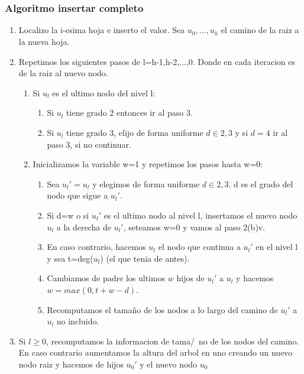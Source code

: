 \documentclass[10pt,handout]{beamer}
\begin{document}
\section{}
\begin{frame}[noframenumbering]
  \frametitle{Algoritmo insertar completo}
\small
\begin{enumerate}\itemsep0em
  \item Localizo la i-esima hoja e inserto el valor. Sea $u_0,...,u_h$ el camino
    de la raiz a la nueva hoja.
  \item Repetimos los siguientes pasos de l=h-1,h-2,...,0. Donde en cada iteracion
    es de la raiz al nuevo nodo.
    \vspace{-0.05cm}
    \begin{enumerate}[a]\itemsep0em
      \item Si $u_l$ es el ultimo nodo del nivel l:
        \vspace{-0.05cm}
        \begin{enumerate}[i]\itemsep0em
          \item Si $u_l$ tiene grado 2 entonces ir al paso 3.
          \item Si $u_l$ tiene grado 3, elijo de forma uniforme $d\in{2,3}$ y si
            $d=4$ ir al paso 3, si no continuar.
        \end{enumerate}
      \item Inicializamos la variable w=1 y repetimos los pasos hasta w=0:
        \vspace{-0.05cm}
        \begin{enumerate}[i]\itemsep0em
          \item Sea $u_l'=u_l$ y elegimos de forma uniforme $d\in{2,3}$. d es el grado
            del nodo que sigue a $u_l'$.
          \item Si d=w o si $u_l'$ es el ultimo nodo al nivel l, insertamos el nuevo nodo $u_l$
            a la derecha de $u_l'$, seteamos w=0 y vamos al paso 2(b)v.
          \item En caso contrario, hacemos $u_l$ el nodo que continua a $u_l'$ en el nivel l y
            sea t=deg($u_l$) (el que tenia de antes).
          \item Cambiamos de padre los ultimos $w$ hijos de $u_l'$ a $u_l$ y hacemos $w=max(0, t+w-d)$.
          \item Recomputamos el tama\~no de los nodos a lo largo del camino de $u_l'$ a $u_l$ no incluido.
        \end{enumerate}
    \end{enumerate}
  \item Si $l\geq$0, recomputamos la informacion de tama/~no de los nodos del camino.
    En caso contrario aumentamos la altura del arbol en uno creando un nuevo nodo raiz
    y hacemos de hijos $u_0'$ y el nuevo nodo $u_0$
\end{enumerate}

\end{frame}
\end{document}
